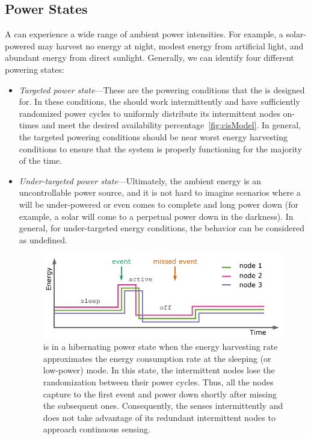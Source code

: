 \subsection{Power States}
\label{sec:power_state}
A \sys can experience a wide range of ambient power intensities. For example, a solar-powered \sys may harvest no energy at night, modest energy from artificial light, and abundant energy from direct sunlight.  Generally, we can identify four different \sys powering states: 
\begin{itemize}
		\item \textit{Targeted power state}---These are the powering conditions that the \sys is designed for. In these  conditions, the \sys should work intermittently and have sufficiently randomized power cycles to uniformly distribute its intermittent nodes on-times and meet the desired availability percentage~\ref{fig:cisModel}. In general, the targeted powering conditions should be near worst energy harvesting conditions to ensure that the system is properly functioning for the majority of the time.
		\item \textit{Under-targeted power state}---Ultimately, the ambient energy is an uncontrollable power source, and it is not hard to imagine scenarios where a \sys will be under-powered or even comes to complete and long power down (for example, a solar \sys will come to a perpetual power down in the darkness). In general, for under-targeted energy conditions, the \sys behavior can be considered as undefined.
%
\begin{figure}
		\centering
		\includegraphics[width=\columnwidth]{figures/hibernating_power_state}
		\caption{\fullsys is in a hibernating power state when the energy harvesting rate approximates the energy consumption rate at the sleeping (or low-power) mode. In this state, the intermittent nodes lose the randomization between their power cycles. Thus, all the nodes capture to the first event and power down shortly after missing the subsequent ones. Consequently, the \sys senses intermittently and does not take advantage of its redundant intermittent nodes to approach continuous sensing.}

\end{figure}
\end{itemize}

